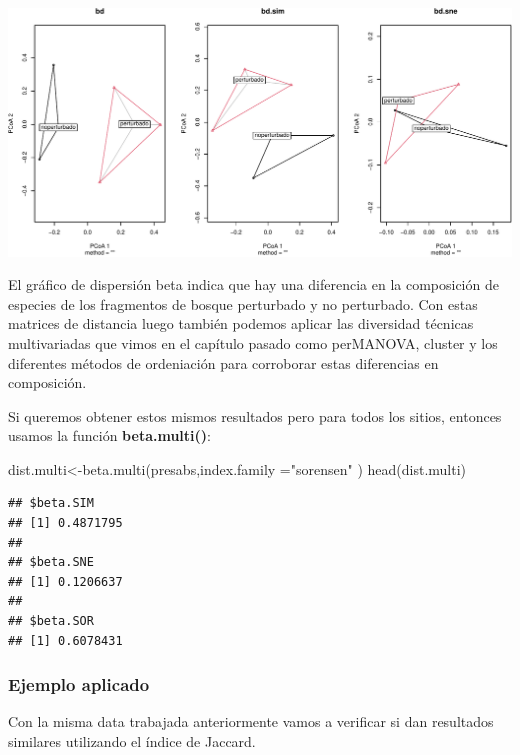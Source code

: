 \documentclass[
]{article}
\newenvironment{Shaded}{\begin{snugshade}}{\end{snugshade}}
\newcommand{\AttributeTok}[1]{\textcolor[rgb]{0.77,0.63,0.00}{#1}}
\newcommand{\FunctionTok}[1]{\textcolor[rgb]{0.00,0.00,0.00}{#1}}
\newcommand{\NormalTok}[1]{#1}
\newcommand{\OtherTok}[1]{\textcolor[rgb]{0.56,0.35,0.01}{#1}}
\newcommand{\StringTok}[1]{\textcolor[rgb]{0.31,0.60,0.02}{#1}}
\begin{document}
\includegraphics{Clase1-bioest_files/figure-latex/unnamed-chunk-26-1.pdf}

\hfill\break

El gráfico de dispersión beta indica que hay una diferencia en la
composición de especies de los fragmentos de bosque perturbado y no
perturbado. Con estas matrices de distancia luego también podemos
aplicar las diversidad técnicas multivariadas que vimos en el capítulo
pasado como perMANOVA, cluster y los diferentes métodos de ordeniación
para corroborar estas diferencias en composición.

Si queremos obtener estos mismos resultados pero para todos los sitios,
entonces usamos la función \textbf{beta.multi()}:

\begin{Shaded}
\begin{Highlighting}[]
\NormalTok{dist.multi}\OtherTok{\textless{}{-}}\FunctionTok{beta.multi}\NormalTok{(presabs,}\AttributeTok{index.family =}\StringTok{"sorensen"}\NormalTok{ )}
\FunctionTok{head}\NormalTok{(dist.multi)}
\end{Highlighting}
\end{Shaded}

\begin{verbatim}
## $beta.SIM
## [1] 0.4871795
## 
## $beta.SNE
## [1] 0.1206637
## 
## $beta.SOR
## [1] 0.6078431
\end{verbatim}

\hypertarget{ejemplo-aplicado-1}{%
\subsubsection{Ejemplo aplicado}\label{ejemplo-aplicado-1}}

Con la misma data trabajada anteriormente vamos a verificar si dan
resultados similares utilizando el índice de Jaccard.

\newpage
\end{document}
